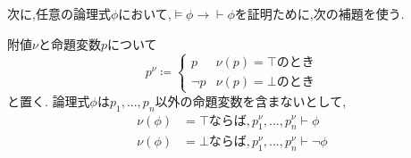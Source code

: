 次に,任意の論理式$\phi$において,$\models \phi \to \vdash \phi$を証明ために,次の補題を使う.
\begin{lemma}
 附値$\nu$と命題変数$p$について
 \begin{equation*}
  p^\nu \coloneqq
	\begin{cases}
	 p & \nu(p) = \top のとき \\
	 \lnot p & \nu(p) = \bot のとき
	\end{cases}
 \end{equation*}
 と置く.
 論理式$\phi$は$p_1,...,p_n$以外の命題変数を含まないとして,
 \begin{align}
  \nu(\phi) &= \top ならば, p_1^{\nu},...,p_n^{\nu} \vdash \phi \label{eq1} \\
  \nu(\phi) &= \bot ならば, p_1^{\nu},...,p_n^{\nu} \vdash \lnot \phi \label{eq2}
 \end{align}
\end{lemma}

